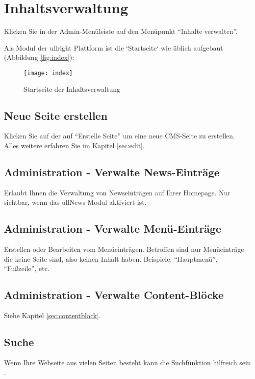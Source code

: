 \documentclass[article, a4paper, oneside, 11pt]{memoir}
\begin{document}
\chapter{Inhaltsverwaltung}

Klicken Sie in der Admin-Menüleiste auf den Menüpunkt "`Inhalte verwalten"'. 

Als Modul der ullright Plattform ist die `Startseite` wie üblich aufgebaut (Abbildung \vref{fig:index}):

\begin{figure}[htp]
\centering
\texttt{[image: index]}
\caption{Startseite der Inhaltsverwaltung}
\label{fig:index}
\end{figure}

\section{Neue Seite erstellen}

Klicken Sie auf der auf "`Erstelle Seite"' um eine neue CMS-Seite zu erstellen. Alles weitere erfahren Sie im Kapitel \vref{sec:edit}.

\section{Administration - Verwalte News-Einträge}

Erlaubt Ihnen die Verwaltung von Newseinträgen auf Ihrer Homepage. Nur sichtbar, wenn das ullNews Modul aktiviert ist.

\section{Administration - Verwalte Menü-Einträge}

Erstellen oder Bearbeiten vom Menüeinträgen. Betroffen sind nur Menüeinträge die keine Seite sind, also keinen Inhalt haben.
Beispiele: "`Hauptmenü"', "`Fußzeile"', etc.

\section{Administration - Verwalte Content-Blöcke}

Siehe Kapitel \vref{sec:contentblock}.

\section{Suche}

Wenn Ihre Webseite aus vielen Seiten besteht kann die Suchfunktion hilfreich sein .
\end{document}
